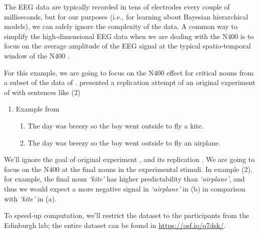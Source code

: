 \documentclass[12pt,]{krantz}
\newenvironment{Shaded}{\begin{snugshade}}{\end{snugshade}}
\newcommand{\CommentTok}[1]{\textcolor[rgb]{0.56,0.35,0.01}{\textit{#1}}}
\newcommand{\DataTypeTok}[1]{\textcolor[rgb]{0.13,0.29,0.53}{#1}}
\newcommand{\KeywordTok}[1]{\textcolor[rgb]{0.13,0.29,0.53}{\textbf{#1}}}
\newcommand{\NormalTok}[1]{#1}
\newcommand{\OperatorTok}[1]{\textcolor[rgb]{0.81,0.36,0.00}{\textbf{#1}}}
\newcommand{\StringTok}[1]{\textcolor[rgb]{0.31,0.60,0.02}{#1}}
\providecommand{\tightlist}{%
  \setlength{\itemsep}{0pt}\setlength{\parskip}{0pt}}
\theoremstyle{definition}
\theoremstyle{definition}
\theoremstyle{definition}
\theoremstyle{remark}
\begin{document}
The EEG data are typically recorded in tens of electrodes every couple of milliseconds, but for our purposes (i.e., for learning about Bayesian hierarchical models), we can safely ignore the complexity of the data. A common way to simplify the high-dimensional EEG data when we are dealing with the N400 is to focus on the average amplitude of the EEG signal at the typical spatio-temporal window of the N400 \citep[see for example][]{frankERPResponseAmount2015}.

For this example, we are going to focus on the N400 effect for critical nouns from a subset of the data of \citet{nieuwlandLargescaleReplicationStudy2018}. \citet{nieuwlandLargescaleReplicationStudy2018} presented a replication attempt of an original experiment of \citet{delongProbabilisticWordPreactivation2005} with sentences like (2)

\begin{enumerate}
\def\labelenumi{\arabic{enumi}.}
\setcounter{enumi}{1}
\tightlist
\item
  Example from \citet{delongProbabilisticWordPreactivation2005}

  \begin{enumerate}
  \def\labelenumii{\alph{enumii}.}
  \tightlist
  \item
    The day was breezy so the boy went outside to fly a kite.
  \item
    The day was breezy so the boy went outside to fly an airplane.
  \end{enumerate}
\end{enumerate}

We'll ignore the goal of original experiment \citep{delongProbabilisticWordPreactivation2005}, and its replication \citep{nieuwlandLargescaleReplicationStudy2018}. We are going to focus on the N400 at the final nouns in the experimental stimuli. In example (2), for example, the final noun \emph{`kite'} has higher predictability than \emph{`airplane'}, and thus we would expect a more negative signal in \emph{`airplane'} in (b) in comparison with \emph{`kite'} in (a).

To speed-up computation, we'll restrict the dataset to the participants from the Edinburgh lab; the entire dataset can be found in \url{https://osf.io/q7dsk/}.

\begin{Shaded}
\end{Shaded}
\end{document}
